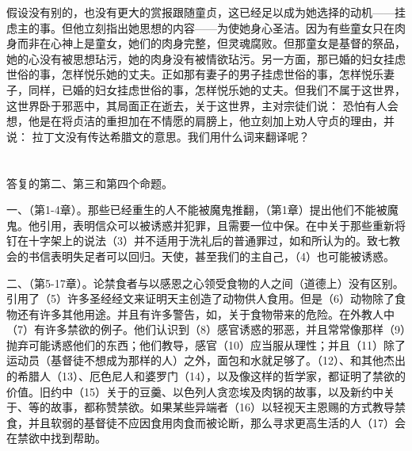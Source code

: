 假设没有别的，也没有更大的赏报跟随童贞，这已经足以成为她选择的动机——挂虑主的事。但他立刻指出她思想的内容——为使她身心圣洁。因为有些童女只在肉身而非在心神上是童女，她们的肉身完整，但灵魂腐败。但那童女是基督的祭品，她的心没有被思想玷污，她的肉身没有被情欲玷污。另一方面，那已婚的妇女挂虑世俗的事，怎样悦乐她的丈夫。正如那有妻子的男子挂虑世俗的事，怎样悦乐妻子，同样，已婚的妇女挂虑世俗的事，怎样悦乐她的丈夫。但我们不属于这世界，这世界卧于邪恶中，其局面正在逝去，关于这世界，主对宗徒们说：  恐怕有人会想，他是在将贞洁的重担加在不情愿的肩膀上，他立刻加上劝人守贞的理由，并说：  拉丁文没有传达希腊文的意思。我们用什么词来翻译呢？\par



\section{}

答复的第二、第三和第四个命题。\par

一、（第1-4章）。那些已经重生的人不能被魔鬼推翻，（第1章）提出他们不能被魔鬼。他引用，表明信众可以被诱惑并犯罪，且需要一位中保。在中关于那些重新将钉在十字架上的说法（3）并不适用于洗礼后的普通罪过，如和所认为的。致七教会的书信表明失足者可以回归。天使，甚至我们的主自己，（4）也可能被诱惑。\par

二、（第5-17章）。论禁食者与以感恩之心领受食物的人之间（道德上）没有区别。引用了（5）许多圣经经文来证明天主创造了动物供人食用。但是（6）动物除了食物还有许多其他用途。并且有许多警告，如，关于食物带来的危险。在外教人中（7）有许多禁欲的例子。他们认识到（8）感官诱惑的邪恶，并且常常像那样（9）抛弃可能诱惑他们的东西；他们教导，感官（10）应当服从理性；并且（11）除了运动员（基督徒不想成为那样的人）之外，面包和水就足够了。（12）、和其他杰出的希腊人（13）、厄色尼人和婆罗门（14），以及像这样的哲学家，都证明了禁欲的价值。旧约中（15）关于的豆羹、以色列人贪恋埃及肉锅的故事，以及新约中关于、等的故事，都称赞禁欲。如果某些异端者（16）以轻视天主恩赐的方式教导禁食，并且软弱的基督徒不应因食用肉食而被论断，那么寻求更高生活的人（17）会在禁欲中找到帮助。\par

